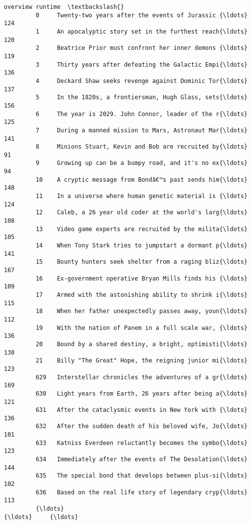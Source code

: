 \documentclass[11pt]{article}
\begin{document}
\begin{Verbatim}[commandchars=\\\{\}]
                                                        overview runtime  \textbackslash{}
         0     Twenty-two years after the events of Jurassic {\ldots}     124   
         1     An apocalyptic story set in the furthest reach{\ldots}     120   
         2     Beatrice Prior must confront her inner demons {\ldots}     119   
         3     Thirty years after defeating the Galactic Empi{\ldots}     136   
         4     Deckard Shaw seeks revenge against Dominic Tor{\ldots}     137   
         5     In the 1820s, a frontiersman, Hugh Glass, sets{\ldots}     156   
         6     The year is 2029. John Connor, leader of the r{\ldots}     125   
         7     During a manned mission to Mars, Astronaut Mar{\ldots}     141   
         8     Minions Stuart, Kevin and Bob are recruited by{\ldots}      91   
         9     Growing up can be a bumpy road, and it's no ex{\ldots}      94   
         10    A cryptic message from Bondâ€™s past sends him{\ldots}     148   
         11    In a universe where human genetic material is {\ldots}     124   
         12    Caleb, a 26 year old coder at the world's larg{\ldots}     108   
         13    Video game experts are recruited by the milita{\ldots}     105   
         14    When Tony Stark tries to jumpstart a dormant p{\ldots}     141   
         15    Bounty hunters seek shelter from a raging bliz{\ldots}     167   
         16    Ex-government operative Bryan Mills finds his {\ldots}     109   
         17    Armed with the astonishing ability to shrink i{\ldots}     115   
         18    When her father unexpectedly passes away, youn{\ldots}     112   
         19    With the nation of Panem in a full scale war, {\ldots}     136   
         20    Bound by a shared destiny, a bright, optimisti{\ldots}     130   
         21    Billy "The Great" Hope, the reigning junior mi{\ldots}     123   
         629   Interstellar chronicles the adventures of a gr{\ldots}     169   
         630   Light years from Earth, 26 years after being a{\ldots}     121   
         631   After the cataclysmic events in New York with {\ldots}     136   
         632   After the sudden death of his beloved wife, Jo{\ldots}     101   
         633   Katniss Everdeen reluctantly becomes the symbo{\ldots}     123   
         634   Immediately after the events of The Desolation{\ldots}     144   
         635   The special bond that develops between plus-si{\ldots}     102   
         636   Based on the real life story of legendary cryp{\ldots}     113   
         {\ldots}                                                 {\ldots}     {\ldots}   

\end{Verbatim}
\end{document}
